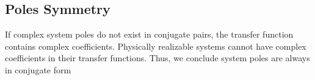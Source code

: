 \subsection{Poles Symmetry} If complex system poles do not exist in conjugate pairs, the transfer function contains complex coefficients. Physically realizable systems cannot have complex coefficients in their transfer functions. Thus, we conclude system poles are always in conjugate form
